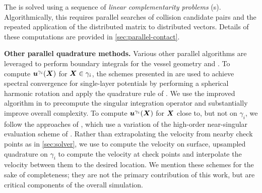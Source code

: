 The \ncp is solved using a sequence of \textit{linear complementarity problems} (\lcp\/s). Algorithmically, this requires parallel searches of collision candidate pairs and the repeated application of the distributed \lcp matrix to distributed
vectors. Details of these computations are provided in \cref{sec:parallel-contact}.

\textbf{Other parallel quadrature methods. }
Various other parallel algorithms are
leveraged to perform boundary integrals for the vessel geometry and \rbcs.
%
To compute ${\bm{u}}^{\gamma_i}({\bm{X}})$ for ${\bm{X}} \in \gamma_i$, the schemes
presented in \cite{Veerapaneni2011} are used to
achieve spectral convergence for single-layer potentials
by performing a spherical harmonic rotation and apply the quadrature rule
of \cite{graham2002fully}.  We use the improved algorithm in
\cite{Malhotra2017} to precompute the singular integration operator
and substantially improve overall complexity.
To compute ${\bm{u}}^{\gamma_i}({\bm{X}})$ for ${\bm{X}}$ close to, but not on $\gamma_i$, we follow the
approaches of \cite{sorgentone2018highly, Malhotra2017}, which use a variation of the high-order near-singular
evaluation scheme of \cite{Ying2006}.  Rather than extrapolating the
velocity from nearby check points as in \cref{sec:solver}, we
use \cite{Veerapaneni2011} to
compute the velocity on surface, upsampled quadrature on $\gamma_i$ to compute
the velocity at check points and interpolate the velocity between them to the desired
location.
We mention these schemes for the sake of completeness; they are not the primary contribution of this work, but are critical components of the overall simulation.

